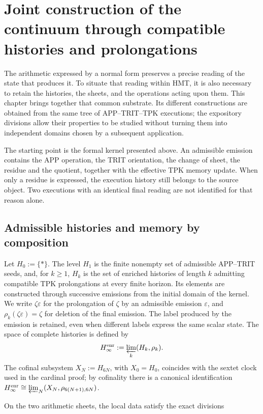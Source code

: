 \section{Joint construction of the continuum through compatible histories and prolongations}
\label{act21:iv:continuo-conjunto}
The arithmetic expressed by a normal form preserves a precise reading of the state that produces it. To situate that reading within HMT, it is also necessary to retain the histories, the sheets, and the operations acting upon them. This chapter brings together that common substrate. Its different constructions are obtained from the same tree of APP–TRIT–TPK executions; the expository divisions allow their properties to be studied without turning them into independent domains chosen by a subsequent application.

The starting point is the formal kernel presented above. An admissible emission contains the APP operation, the TRIT orientation, the change of sheet, the residue and the quotient, together with the effective TPK memory update. When only a residue is expressed, the execution history still belongs to the source object. Two executions with an identical final reading are not identified for that reason alone.

\subsection{Admissible histories and memory by composition}
Let \(H_0:=\{\ast\}\). The level \(H_1\) is the finite nonempty set of
admissible APP--TRIT seeds, and, for \(k\geq1\), \(H_k\) is the set of
enriched histories of length \(k\) admitting compatible TPK prolongations
at every finite horizon. Its elements are constructed through successive emissions
from the initial domain of the kernel. We write \(\zeta\varepsilon\)
for the prolongation of \(\zeta\) by an admissible emission \(\varepsilon\), and
\(\rho_k(\zeta\varepsilon)=\zeta\) for deletion of the final emission. The label
produced by the emission is retained, even when different labels express
the same scalar state. The space of complete histories is defined by
\[
 H_\infty^{\rm enr}:=\varprojlim_k(H_k,\rho_k).
\]
The cofinal subsystem \(X_N:=H_{6N}\), with \(X_0=H_0\), coincides with the
sextet clock used in the cardinal proof; by cofinality there is a canonical
identification
\(H_\infty^{\rm enr}\cong\varprojlim_N(X_N,\rho_{6(N+1),6N})\).

On the two arithmetic sheets, the local data satisfy the exact divisions

